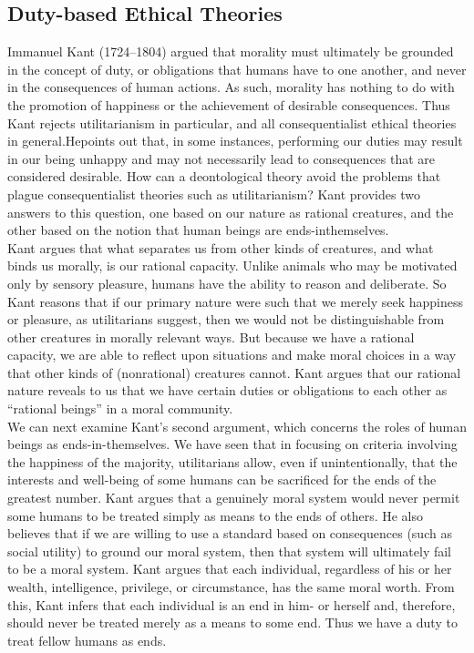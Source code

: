 \documentclass[12pt]{article}
\theoremstyle{definition}
\begin{document}
\subsection{Duty-based Ethical Theories}
Immanuel Kant (1724–1804) argued that morality must ultimately be grounded in the
concept of duty, or obligations that humans have to one another, and never in the consequences
of human actions. As such, morality has nothing to do with the promotion of
happiness or the achievement of desirable consequences. Thus Kant rejects utilitarianism in particular, and all consequentialist ethical theories in general.Hepoints out that, in some
instances, performing our duties may result in our being unhappy and may not necessarily
lead to consequences that are considered desirable. How can a
deontological theory avoid the problems that plague consequentialist theories such as
utilitarianism? Kant provides two answers to this question, one based on our nature as
rational creatures, and the other based on the notion that human beings are ends-inthemselves.\\
Kant argues
that what separates us from other kinds of creatures, and what binds us morally, is our
rational capacity. Unlike animals who may be motivated only by sensory pleasure,
humans have the ability to reason and deliberate. So Kant reasons that if our primary
nature were such that we merely seek happiness or pleasure, as utilitarians suggest, then
we would not be distinguishable from other creatures in morally relevant ways. But
because we have a rational capacity, we are able to reflect upon situations and make
moral choices in a way that other kinds of (nonrational) creatures cannot. Kant argues
that our rational nature reveals to us that we have certain duties or obligations to each
other as “rational beings” in a moral community.\\
We can next examine Kant’s second argument, which concerns the roles of human
beings as ends-in-themselves. We have seen that in focusing on criteria involving the
happiness of the majority, utilitarians allow, even if unintentionally, that the interests and
well-being of some humans can be sacrificed for the ends of the greatest number. Kant
argues that a genuinely moral system would never permit some humans to be treated
simply as means to the ends of others. He also believes that if we are willing to use a
standard based on consequences (such as social utility) to ground our moral system, then
that system will ultimately fail to be a moral system. Kant argues that each individual,
regardless of his or her wealth, intelligence, privilege, or circumstance, has the same
moral worth. From this, Kant infers that each individual is an end in him- or herself and,
therefore, should never be treated merely as a means to some end. Thus we have a duty to
treat fellow humans as ends.
\end{document}

